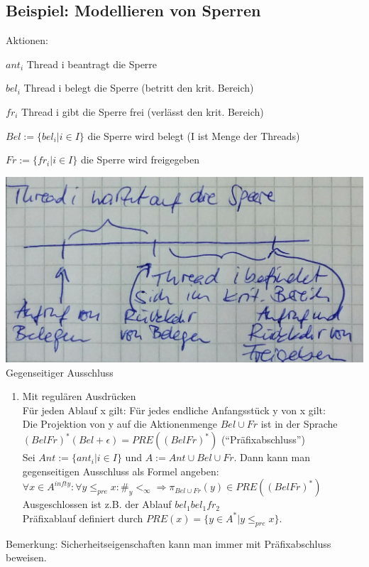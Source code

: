 \subsection*{Beispiel: Modellieren von Sperren}
Aktionen:
\begin{description}
	\item {$ant_i$} Thread i beantragt die Sperre
	\item {$bel_i$} Thread i belegt die Sperre (betritt den krit. Bereich)
	\item {$fr_i$} Thread i gibt die Sperre frei (verlässt den krit. Bereich)
	\item {$Bel:=\{bel_i | i \in I\}$} die Sperre wird belegt (I ist Menge der Threads)
	\item {$Fr:=\{fr_i | i \in I\}$} die Sperre wird freigegeben
\end{description}
\includegraphics[width=.4\textwidth]{Verifikation_Zeitstrahl4.jpeg}\\
Gegenseitiger Ausschluss
\begin{enumerate}
	\item Mit regulären Ausdrücken\\Für jeden Ablauf x gilt: Für jedes endliche Anfangsstück y von x gilt:\\
	Die Projektion von y auf die Aktionenmenge $Bel \cup Fr$ ist in der Sprache $(Bel Fr)^*(Bel + \epsilon) = PRE((Bel Fr)^*)$ ("`Präfixabschluss"')\\
	Sei $Ant:=\{ant_i | i \in I\}$ und $A:=Ant \cup Bel \cup Fr$. Dann kann man gegenseitigen Ausschluss als Formel angeben: $\forall x \in A^{infty}: \forall y \leq_{pre} x: \#_y <_\infty \Rightarrow \pi_{Bel \cup Fr}(y) \in PRE((Bel Fr)^*)$ Ausgeschlossen ist z.B. der Ablauf $bel_1 bel_1 fr_2$\\
	Präfixablauf definiert durch $PRE(x)= \{y \in A^* | y \leq_{pre} x \}$.
\end{enumerate}

Bemerkung: Sicherheitseigenschaften kann man immer mit Präfixabschluss beweisen.